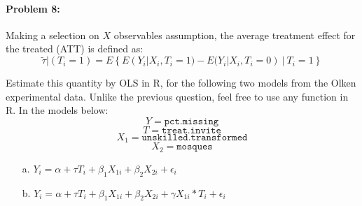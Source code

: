 \documentclass{article}
\begin{document}
\paragraph{Problem 8:}

Making a selection on $X$ observables assumption,  the average
treatment effect for the treated (ATT) is defined as: 
$$
\tilde{\tau}|(T_i=1) = E\left\{ E(Y_i|X_i,T_i=1) -E(Y_i|X_i,T_i=0)\  |\ T_i=1\right\} 
$$


\noindent Estimate this quantity by OLS in R, for the following two
models from the Olken experimental data. Unlike the previous question,
feel free to use any function in R. In the models below:
$$
Y =  \texttt{pct.missing}
$$
$$
T = \texttt{treat.invite}
$$
$$
X_{1} = \texttt{unskilled.transformed}
$$
$$
X_{2} = \texttt{mosques}
$$


\begin{itemize}
\item[a.] $Y_i = \alpha + \tau
 T_i + \beta_1X_{1i}+\beta_2X_{2i}+\epsilon_i$
\item[b.] $Y_i = \alpha + \tau
 T_i + \beta_1X_{1i}+\beta_2X_{2i}+\gamma X_{1i}*T_i+\epsilon_i$
\end{itemize}

 
\end{document}

